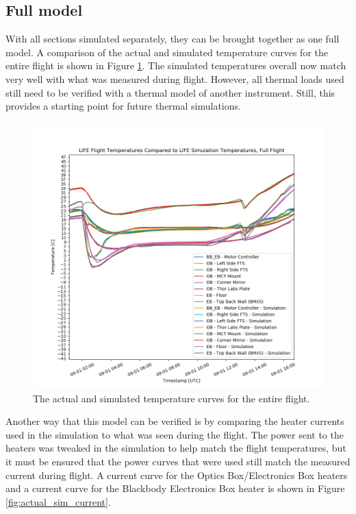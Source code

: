 \subsection{Full model}\label{full_temp_model}
With all sections simulated separately, they can be brought together as one full model. A comparison of the actual and simulated temperature curves for the entire flight is shown in Figure \ref{fig:full_flight_temps_with_sim}. The simulated temperatures overall now match very well with what was measured during flight. However, all thermal loads used still need to be verified with a thermal model of another instrument. Still, this provides a starting point for future thermal simulations.

\begin{figure}
    \centering
    \includegraphics[width=\textwidth]{chap4_images/full_flight_with_sim_temps.png}
    \caption{The actual and simulated temperature curves for the entire flight.}
    \label{fig:full_flight_temps_with_sim}
\end{figure}

Another way that this model can be verified is by comparing the heater currents used in the simulation to what was seen during the flight. The power sent to the heaters was tweaked in the simulation to help match the flight temperatures, but it must be ensured that the power curves that were used still match the measured current during flight. A current curve for the Optics Box/Electronics Box heaters and a current curve for the Blackbody Electronics Box heater is shown in Figure \ref{fig:actual_sim_current}.

